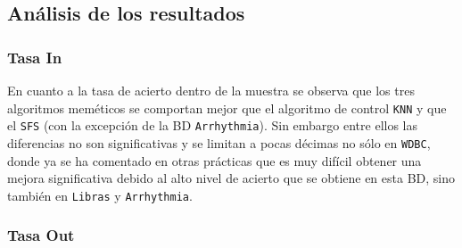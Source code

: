 \documentclass[11pt,leqno]{article}
\begin{document}
\subsection{Análisis de los resultados}

\subsubsection{Tasa In}
\begin{center}
\end{center}

	En cuanto a la tasa de acierto dentro de la muestra se observa que los tres algoritmos meméticos se comportan mejor que el algoritmo de control \texttt{KNN} y que el \texttt{SFS} (con la excepción de la BD \texttt{Arrhythmia}). Sin embargo entre ellos las diferencias no son significativas y se limitan a pocas décimas no sólo en \texttt{WDBC}, donde ya se ha comentado en otras prácticas que es muy difícil obtener una mejora significativa debido al alto nivel de acierto que se obtiene en esta BD, sino también en \texttt{Libras} y \texttt{Arrhythmia}. 

\subsubsection{Tasa Out}
\begin{center}
\end{center}
\end{document}
